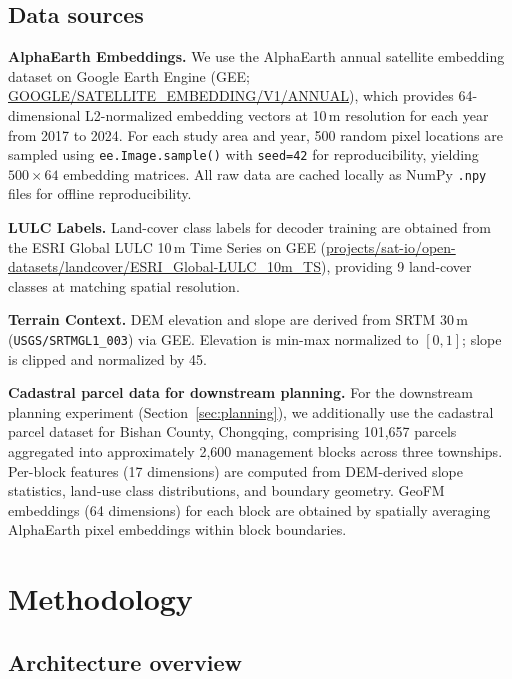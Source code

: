 \documentclass{article}
\begin{document}
\subsection{Data sources}

\textbf{AlphaEarth Embeddings.} We use the AlphaEarth annual satellite embedding dataset on Google Earth Engine (GEE; \url{GOOGLE/SATELLITE_EMBEDDING/V1/ANNUAL}), which provides 64-dimensional L2-normalized embedding vectors at 10\,m resolution for each year from 2017 to 2024. For each study area and year, 500 random pixel locations are sampled using \texttt{ee.Image.sample()} with \texttt{seed=42} for reproducibility, yielding $500\times64$ embedding matrices. All raw data are cached locally as NumPy \texttt{.npy} files for offline reproducibility.

\textbf{LULC Labels.} Land-cover class labels for decoder training are obtained from the ESRI Global LULC 10\,m Time Series on GEE (\url{projects/sat-io/open-datasets/landcover/ESRI_Global-LULC_10m_TS}), providing 9 land-cover classes at matching spatial resolution.

\textbf{Terrain Context.} DEM elevation and slope are derived from SRTM 30\,m (\texttt{USGS/SRTMGL1\_003}) via GEE. Elevation is min-max normalized to $[0,1]$; slope is clipped and normalized by 45\textdegree.

\textbf{Cadastral parcel data for downstream planning.} For the downstream planning experiment (Section~\ref{sec:planning}), we additionally use the cadastral parcel dataset for Bishan County, Chongqing, comprising 101{,}657 parcels aggregated into approximately 2{,}600 management blocks across three townships. Per-block features (17 dimensions) are computed from DEM-derived slope statistics, land-use class distributions, and boundary geometry. GeoFM embeddings (64 dimensions) for each block are obtained by spatially averaging AlphaEarth pixel embeddings within block boundaries.


\section{Methodology}
\label{sec:method}

\subsection{Architecture overview}
\end{document}
